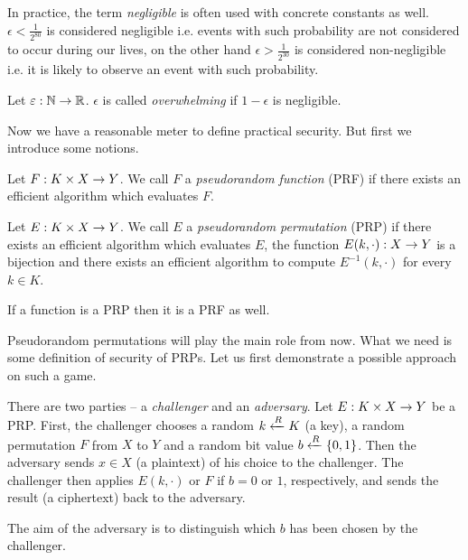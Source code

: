 \begin{note}
\label{note:neglconst}
	In practice, the term {\em negligible} is often used with concrete constants as well. $\epsilon<\frac{1}{2^{80}}$ is considered negligible i.e. events with such probability are not considered to occur during our lives, on the other hand $\epsilon>\frac{1}{2^{30}}$ is considered non-negligible i.e. it is likely to observe an event with such probability.
\end{note}

\begin{defn}
\label{def:overwh}
	Let $\varepsilon:\mathbb{N}\rightarrow\mathbb{R}$. $\epsilon$ is called {\em overwhelming} if $1-\epsilon$ is negligible.
\end{defn}

Now we have a reasonable meter to define practical security. But first we introduce some notions.   %

\begin{defn}   %
	Let $F: K\times X\rightarrow Y$. We call $F$ a {\em pseudorandom function} (PRF) if there exists an efficient algorithm which evaluates $F$.
\end{defn}

\begin{defn}
	Let $E: K\times X\rightarrow Y$. We call $E$ a {\em pseudorandom permutation} (PRP) if there exists an efficient algorithm which evaluates $E$, the function $E(k,\cdot): X\rightarrow Y$ is a bijection and there exists an efficient algorithm to compute $E^{-1}(k,\cdot)$ for every $k\in K$.
\end{defn}

\begin{note}
	If a function is a PRP then it is a PRF as well.
\end{note}

Pseudorandom permutations will play the main role from now. What we need is some definition of security of PRPs. Let us first demonstrate a possible approach on such a game.

\begin{game}
\label{game:prp}
	There are two parties -- a {\em challenger} and an {\em adversary}. Let $E:K\times X\rightarrow Y$ be a PRP. First, the challenger chooses a random $k\xleftarrow{R} K$ (a key), a random permutation $F$ from $X$ to $Y$ and a random bit value $b\xleftarrow{R}\{0,1\}$. Then the adversary sends $x\in X$ (a plaintext) of his choice to the challenger. The challenger then applies $E(k,\cdot)$ or $F$ if $b=0$ or $1$, respectively, and sends the result (a ciphertext) back to the adversary.
	
	The aim of the adversary is to distinguish which $b$ has been chosen by the challenger.
\end{game}

